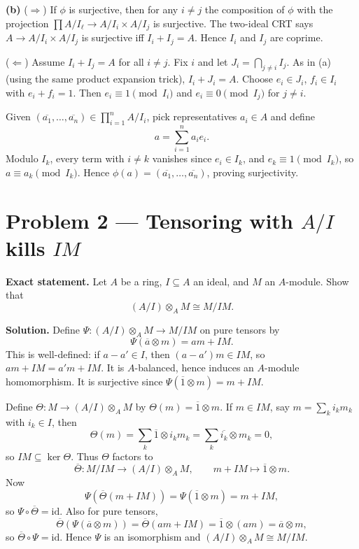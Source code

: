 \documentclass[12pt,a4paper]{article}
\theoremstyle{plain}
\theoremstyle{definition}      %
\begin{document}
	\medskip
	\textbf{(b)} (\(\Rightarrow\)) If \(\phi\) is surjective, then for any \(i\neq j\) the composition of \(\phi\) with the
	projection \(\prod A/I_\ell \to A/I_i\times A/I_j\) is surjective. The two-ideal CRT says
	\(A\to A/I_i\times A/I_j\) is surjective iff \(I_i+I_j=A\). Hence \(I_i\) and \(I_j\) are coprime.
	
	(\(\Leftarrow\)) Assume \(I_i+I_j=A\) for all \(i\neq j\). Fix \(i\) and let \(J_i=\bigcap_{j\neq i} I_j\).
	As in (a) (using the same product expansion trick), \(I_i+J_i=A\). Choose \(e_i\in J_i\), \(f_i\in I_i\)
	with \(e_i+f_i=1\). Then \(e_i\equiv 1\pmod{I_i}\) and \(e_i\equiv 0\pmod{I_j}\) for \(j\neq i\).
	
	Given \((\overline{a_1},\dots,\overline{a_n})\in \prod_{i=1}^n A/I_i\), pick representatives \(a_i\in A\) and define
	\[
	a=\sum_{i=1}^n a_i e_i.
	\]
	Modulo \(I_k\), every term with \(i\neq k\) vanishes since \(e_i\in I_k\), and \(e_k\equiv 1\pmod{I_k}\),
	so \(a\equiv a_k\pmod{I_k}\). Hence \(\phi(a)=(\overline{a_1},\dots,\overline{a_n})\), proving surjectivity.
	
	\section*{Problem 2 — Tensoring with \(A/I\) kills \(IM\)}
	
	\textbf{Exact statement.}
	Let \(A\) be a ring, \(I\subseteq A\) an ideal, and \(M\) an \(A\)-module. Show that
	\[
	(A/I)\otimes_A M \cong M/IM.
	\]
	
	\textbf{Solution.}
	Define \(\Psi:(A/I)\otimes_A M\to M/IM\) on pure tensors by
	\[
	\Psi(\overline{a}\otimes m)=am+IM.
	\]
	This is well-defined: if \(a-a'\in I\), then \((a-a')m\in IM\), so \(am+IM=a'm+IM\).
	It is \(A\)-balanced, hence induces an \(A\)-module homomorphism. It is surjective since
	\(\Psi(\overline{1}\otimes m)=m+IM\).
	
	Define \(\Theta:M\to (A/I)\otimes_A M\) by \(\Theta(m)=\overline{1}\otimes m\).
	If \(m\in IM\), say \(m=\sum_k i_k m_k\) with \(i_k\in I\), then
	\[
	\Theta(m)=\sum_k \overline{1}\otimes i_k m_k=\sum_k \overline{i_k}\otimes m_k=0,
	\]
	so \(IM\subseteq \ker\Theta\). Thus \(\Theta\) factors to
	\[
	\overline{\Theta}:M/IM\to (A/I)\otimes_A M,\qquad m+IM\mapsto \overline{1}\otimes m.
	\]
	Now
	\[
	\Psi(\overline{\Theta}(m+IM))=\Psi(\overline{1}\otimes m)=m+IM,
	\]
	so \(\Psi\circ\overline{\Theta}=\mathrm{id}\). Also for pure tensors,
	\[
	\overline{\Theta}(\Psi(\overline{a}\otimes m))
	=\overline{\Theta}(am+IM)=\overline{1}\otimes (am)=\overline{a}\otimes m,
	\]
	so \(\overline{\Theta}\circ \Psi=\mathrm{id}\). Hence \(\Psi\) is an isomorphism and
	\((A/I)\otimes_A M \cong M/IM\).
	
\end{document}
